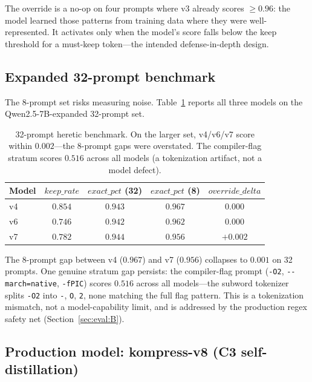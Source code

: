The override is a no-op on four prompts where v3 already scores $\ge 0.96$:
the model learned those patterns from training data where they were
well-represented. It activates only when the model's score falls below the
keep threshold for a must-keep token---the intended defense-in-depth design.

\subsection{Expanded 32-prompt benchmark}
\label{sec:eval:expanded}

The 8-prompt set risks measuring noise. Table~\ref{tab:32prompt} reports all
three models on the Qwen2.5-7B-expanded 32-prompt set.

\begin{table}[h]
\centering
\caption{32-prompt heretic benchmark. On the larger set, v4/v6/v7 score
within $0.002$---the 8-prompt gaps were overstated. The compiler-flag stratum
scores $0.516$ across all models (a tokenization artifact, not a model
defect).}
\label{tab:32prompt}
\begin{tabular}{lcccc}
\toprule
Model & $\mathit{keep\_rate}$ & $\mathit{exact\_pct}$ (32) & $\mathit{exact\_pct}$ (8) & $\mathit{override\_delta}$ \\
\midrule
v4 & $0.854$ & $0.943$ & $0.967$ & $0.000$ \\
v6 & $0.746$ & $0.942$ & $0.962$ & $0.000$ \\
v7 & $0.782$ & $0.944$ & $0.956$ & $+0.002$ \\
\bottomrule
\end{tabular}
\end{table}

The 8-prompt gap between v4 ($0.967$) and v7 ($0.956$) collapses to $0.001$
on 32 prompts. One genuine stratum gap persists: the compiler-flag prompt
(\texttt{-O2}, \texttt{-{}-march=native}, \texttt{-fPIC}) scores $0.516$
across all models---the subword tokenizer splits \texttt{-O2} into
\texttt{-}, \texttt{O}, \texttt{2}, none matching the full flag pattern. This
is a tokenization mismatch, not a model-capability limit, and is addressed by
the production regex safety net (Section~\ref{sec:eval:B}).

\subsection{Production model: kompress-v8 (C3 self-distillation)}
\label{sec:eval:v8}

